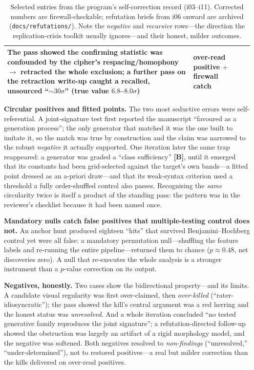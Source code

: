 \documentclass[11pt]{article}
\begin{document}
\begin{table}[t]
\begin{tabular}{@{}p{2.5cm}p{4.4cm}p{4.2cm}p{2.2cm}@{}}
The pass showed the confirming statistic was confounded by the cipher's respacing/homophony
$\rightarrow$ retracted the whole exclusion; a further pass on the retraction write-up caught a
recalled, unsourced ``$\sim\!30\sigma$'' (true value $6.8$--$8.0\sigma$) & over-read positive
$+$ firewall catch \\
\bottomrule
\end{tabular}
\caption{Selected entries from the program's self-correction record (i03--i11). Corrected
numbers are firewall-checkable; refutation briefs from i06 onward are archived
(\texttt{docs/refutations/}). Note the \emph{negative} and \emph{recursive} rows---the
direction the replication-crisis toolkit usually ignores---and their honest, milder outcomes.}
\label{tab:record}
\end{table}

\textbf{Circular positives and fitted points.} The two most seductive errors were
self-referential. A joint-signature test first reported the manuscript ``favoured as a
generation process''; the only generator that matched it was the one built to imitate it, so
the match was true by construction and the claim was narrowed to the robust \emph{negative}
it actually supported. One iteration later the same trap reappeared: a generator was graded a
``class sufficiency'' \textbf{[B]}, until it emerged that its constants had been grid-selected
against the target's own bands---a fitted point dressed as an a-priori draw---and that its
weak-syntax criterion used a threshold a fully order-shuffled control also passes. Recognising
the \emph{same} circularity twice is itself a product of the standing pass: the pattern was in
the reviewer's checklist because it had been named once.

\textbf{Mandatory nulls catch false positives that multiple-testing control does not.} An
anchor hunt produced eighteen ``hits'' that survived Benjamini--Hochberg control yet were all
false: a mandatory permutation null---shuffling the feature labels and re-running the entire
pipeline---returned them to chance ($p\approx0.48$, net discoveries zero). A null that
re-executes the whole analysis is a stronger instrument than a $p$-value correction on its
output.

\textbf{Negatives, honestly.} Two cases show the bidirectional property---and its limits. A
candidate visual regularity was first over-claimed, then \emph{over-killed}
(``rater-idiosyncratic''); the pass showed the kill's central argument was a red herring and
the honest status was \emph{unresolved}. And a whole iteration concluded ``no tested
generative family reproduces the joint signature''; a refutation-directed follow-up showed the
obstruction was largely an artifact of a rigid morphology model, and the negative was
softened. Both negatives resolved to \emph{non-findings} (``unresolved,''
``under-determined''), not to restored positives---a real but milder correction than the kills
delivered on over-read positives.
\end{document}
